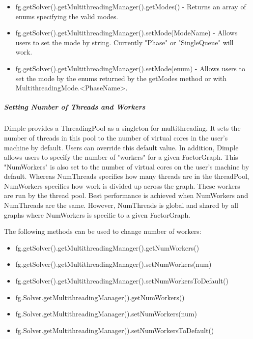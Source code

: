 \ifjava
\begin{itemize}
\item fg.getSolver().getMultithreadingManager().getModes() - Returns an array of enums specifying the valid modes.
\item fg.getSolver().getMultithreadingManager().setMode(ModeName) - Allows users to set the mode by string.  Currently "Phase" or "SingleQueue" will work.
\item fg.getSolver().getMultithreadingManager().setMode(enum) - Allows users to set the mode by the enums returned by the getModes method or with MultithreadingMode.<PhaseName>.
\end{itemize}
\fi

\subparagraph{Setting Number of Threads and Workers}

Dimple provides a ThreadingPool as a singleton for multithreading.  It sets the number of threads in this pool to the number of virtual cores in the user's machine by default.  Users can override this default value.  In addition, Dimple allows users to specify the number of "workers" for a given FactorGraph.  This "NumWorkers" is also set to the number of virtual cores on the user's machine by default.  Whereas NumThreads specifies how many threads are in the threadPool, NumWorkers specifies how work is divided up across the graph.  These workers are run by the thread pool.  Best performance is achieved when NumWorkers and NumThreads are the same.  However, NumThreads is global and shared by all graphs where NumWorkers is specific to a given FactorGraph.

The following methods can be used to change number of workers:

\ifjava
\begin{itemize}
\item fg.getSolver().getMultithreadingManager().getNumWorkers()
\item fg.getSolver().getMultithreadingManager().setNumWorkers(num)
\item fg.getSolver().getMultithreadingManager().setNumWorkersToDefault()
\end{itemize}
\fi

\ifmatlab
\begin{itemize}
\item fg.Solver.getMultithreadingManager().getNumWorkers()
\item fg.Solver.getMultithreadingManager().setNumWorkers(num)
\item fg.Solver.getMultithreadingManager().setNumWorkersToDefault()
\end{itemize}
\fi

